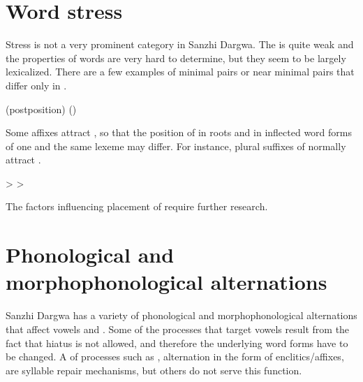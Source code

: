 
\section{Word stress}
\label{sec:Word stress}

Stress is not a very prominent category in Sanzhi Dargwa. The  is quite weak and the  properties of words are very hard to determine, but they seem to be largely lexicalized. There are a few examples of minimal pairs or near minimal pairs that differ only in  .
%
\begin{exe}
	\ex	\label{ex:stress minimal pairs phon}
	\begin{xlist}
\TabPositions{14em}
		\ex	{} 		\tab {} 
		\ex	{} 		\tab {} 		
		\ex	{}  (postposition) \tab {}  ()
		\ex	{}  \tab {} 
	\end{xlist}
\end{exe}

Some affixes attract , so that the position of  in roots and in inflected word forms of one and the same lexeme may differ. For instance, plural suffixes of  normally attract  .
%
\begin{exe}
	\ex	\label{ex:plural attract stress phon}
	\begin{xlist}
		\ex	{}  >  \sqt{sack\tsc{-pl}}
		\ex	{}  >  \sqt{pit\tsc{-pl}}
	\end{xlist}
\end{exe}

The factors influencing placement of  require further research.



\section{Phonological and morphophonological alternations}
\label{sec:Phonological and morphophonological alternations}

Sanzhi Dargwa has a variety of phonological and morphophonological alternations that affect vowels and . Some of the processes that target vowels result from the fact that hiatus is not allowed, and therefore the underlying word forms have to be changed. A  of processes such as , alternation in the form of enclitics\slash affixes,  are syllable repair mechanisms, but others do not serve this function.

